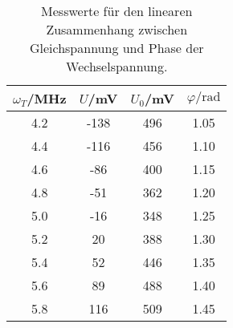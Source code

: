 \begin{table}
\centering
\caption{Messwerte für den linearen Zusammenhang zwischen Gleichspannung und Phase der Wechselspannung.}
\begin{tabular}{cccc}
$\omega_T$/MHz &  $U$/mV &  $U_0$/mV & $\varphi/\si{\radian}$ \\
\midrule
         4.2 &  -138 &     496 &	1.05 \\
         4.4 &  -116 &     456 &        1.10 \\
         4.6 &   -86 &     400 &        1.15 \\
         4.8 &   -51 &     362 &        1.20 \\
         5.0 &   -16 &     348 &        1.25 \\
         5.2 &    20 &     388 &        1.30 \\
         5.4 &    52 &     446 &        1.35 \\
         5.6 &    89 &     488 &        1.40 \\
         5.8 &   116 &     509 &        1.45 \\
\end{tabular}
\label{tab:e}
\end{table}
